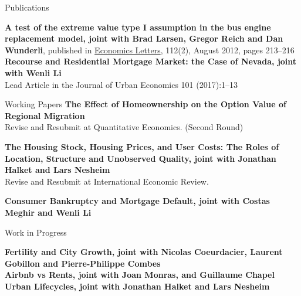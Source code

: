 \documentclass{cvjobmarket} %
\begin{document}
\newpage


\begin{rSection}{Publications}

{\textbf{A test of the extreme value type I assumption in the bus engine replacement model, joint with Brad Larsen, Gregor Reich and Dan Wunderli}, published in \href{http://www.sciencedirect.com/science/article/pii/S0165176512000870}{Economics Letters}, 112(2), August 2012, pages 213--216}\\ 


{\textbf{Recourse and Residential Mortgage Market: the Case of Nevada, joint with Wenli Li}} \\
{Lead Article in the Journal of Urban Economics 101 (2017):1–13}

\end{rSection}

\begin{rSection}{Working Papers}
{\textbf{The Effect of Homeownership on the Option Value of Regional Migration}}\\
{Revise and Resubmit at Quantitative Economics. (Second Round)}

{\textbf{The Housing Stock, Housing Prices, and User Costs: The Roles of Location, Structure and Unobserved Quality, joint with Jonathan Halket and Lars Nesheim}} \\
{Revise and Resubmit at International Economic Review.}

{\textbf{Consumer Bankruptcy and Mortgage Default, joint with Costas Meghir and Wenli Li}} \\



\end{rSection}
\begin{rSection}{Work in Progress}

{\textbf{Fertility and City Growth, joint with Nicolas Coeurdacier, Laurent Gobillon and Pierre-Philippe Combes}} \\

{\textbf{Airbnb vs Rents, joint with Joan Monras, and Guillaume Chapel}} \\

{\textbf{Urban Lifecycles, joint with Jonathan Halket and Lars Nesheim}} \\

\end{rSection}
\end{document}
